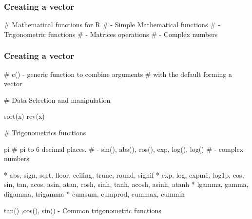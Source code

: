 \begin{frame}[fragile]
\frametitle{Creating a vector}
# Mathematical functions for R
# - Simple Mathematical functions
# - Trigonometric functions
# - Matrices operations
# - Complex numbers

\end{frame}
\begin{frame}[fragile]
\frametitle{Creating a vector}
# c() - generic function to combine arguments 
# with the default forming a vector

\end{frame}
\begin{frame}[fragile]# Data Selection and manipulation

sort(x)
rev(x)
\end{frame}
\begin{frame}[fragile]# Trigonometrics functions

pi            #   pi to 6 decimal places.
# - sin(), abs(), cos(), exp, log(), log()
# - complex numbers

	* abs, sign, sqrt, floor, ceiling, trunc, round, signif
	* exp, log, expm1, log1p, cos, sin, tan, acos, asin, atan, cosh, sinh, tanh, acosh, asinh, atanh
	* lgamma, gamma, digamma, trigamma
	* cumsum, cumprod, cummax, cummin 


tan() ,cos(), sin()   - Common trigonometric functions



\end{frame}


